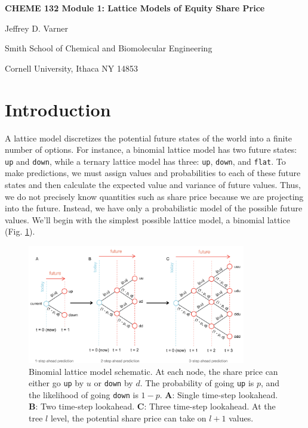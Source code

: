 \documentclass[11pt]{article}
\theoremstyle{definition}
\begin{document}
{\par\centering\textbf{\Large CHEME 132 Module 1: Lattice Models of Equity Share Price}}
\vspace{0.2in}
{\par \centering \large{Jeffrey D. Varner}}
\vspace{0.05in}
{\par \centering \large{Smith School of Chemical and Biomolecular Engineering}}
{\par \centering \large{Cornell University, Ithaca NY 14853}}

\date{}
\thispagestyle{empty}

\setcounter{page}{1}

\section*{Introduction}
A lattice model discretizes the potential future states of the world into a finite number of options. 
For instance, a binomial lattice model has two future states: \texttt{up} and \texttt{down}, while a ternary lattice model has three: \texttt{up}, \texttt{down}, and \texttt{flat}. 
To make predictions, we must assign values and probabilities to each of these future states and then calculate the expected value and variance of future values. 
Thus, we do not precisely know quantities such as share price because we are projecting into the future. Instead, we have only a probabilistic model of the possible future values. 
We'll begin with the simplest possible lattice model, a binomial lattice (Fig. \ref{fig:binomial-lattice-schematic}).
\begin{figure}[h]
    \centering
    \includegraphics[width=0.85\textwidth]{./figs/Fig-Binomial-LatticeModels-Schematic.pdf}
    \caption{Binomial lattice model schematic. 
	At each node, the share price can either go \texttt{up} by $u$ or \texttt{down} by $d$. 
	The probability of going \texttt{up} is $p$, and the likelihood of going \texttt{down} is $1-p$. 
	\textbf{A}: Single time-step lookahead.
	\textbf{B}: Two time-step lookahead.
	\textbf{C}: Three time-step lookahead.
	At the tree $l$ level, the potential share price can take on $l+1$ values.
	}\label{fig:binomial-lattice-schematic}
\end{figure}
\end{document}
